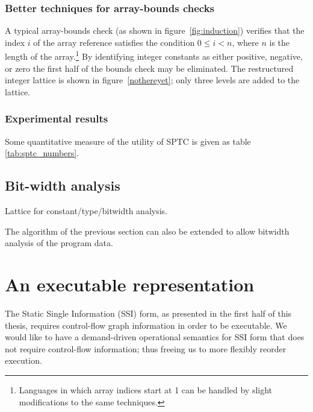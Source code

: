 \documentclass[12pt,titlepage,twoside]{article}
\newcommand*{\figscale}{1.0}
\let\oldsection\section
\renewcommand{\section}{\setcounter{figure}{0}\setcounter{table}{0}\oldsection}
\begin{document}
\subsubsection{Better techniques for array-bounds checks}
A typical array-bounds check (as shown in figure~\ref{fig:induction})
verifies that the index $i$ of the array reference satisfies the
condition $0\leq i < n$, where $n$ is the length of the
array.\footnote{Languages in which array indices start at 1 can be
handled by slight modifications to the same techniques.} By
identifying integer constants as either positive, negative, or zero
the first half of the bounds check may be eliminated.  The
restructured integer lattice is shown in figure~\ref{nothereyet}; only
three levels are added to the lattice.

\subsubsection{Experimental results}\label{sec:sptc_results}
Some quantitative measure of the
utility of SPTC is given as table \ref{tab:sptc_numbers}.

\subsection{Bit-width analysis}\label{sec:bitwidth}
\begin{myfigure}[t]
\centering\renewcommand*{\figscale}{0.6}
\caption{Lattice for constant/type/bitwidth analysis.}
\label{fig:lattice}
\end{myfigure}
The algorithm of the previous section
can also be extended to allow bitwidth analysis of the program data.%

\section{An executable representation}\label{sec:ssiplus}
The Static Single Information (SSI) form, as presented in the first
half of this thesis,
requires control-flow graph information in order to be executable. We
would like to have a demand-driven operational semantics for SSI form
that does not require control-flow information; thus freeing us to
more flexibly reorder execution.
\end{document}
